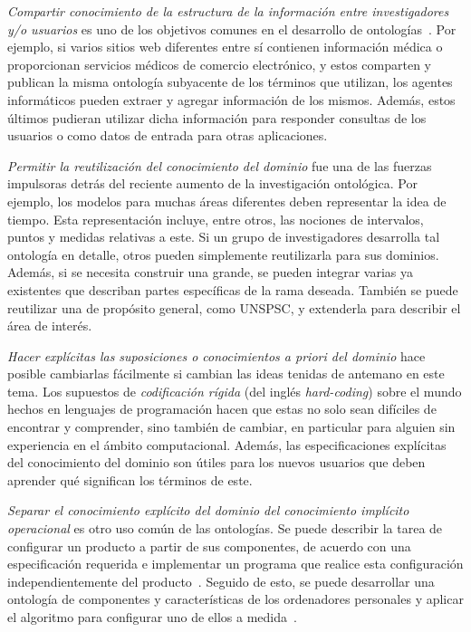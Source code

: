 \textit{Compartir conocimiento de la estructura de la información entre investigadores y/o usuarios} es uno de los objetivos comunes en el desarrollo de ontologías~\cite{ref:4,ref:10}. Por ejemplo, si varios sitios web diferentes entre sí contienen información médica o proporcionan servicios médicos de comercio electrónico, y estos comparten y publican la misma ontología subyacente de los términos que utilizan, los agentes informáticos pueden extraer y agregar información de los mismos. Además, estos últimos pudieran utilizar dicha información para responder consultas de los usuarios o como datos de entrada para otras aplicaciones.

\textit{Permitir la reutilización del conocimiento del dominio} fue una de las fuerzas impulsoras detrás del reciente aumento de la investigación ontológica. Por ejemplo, los modelos para muchas áreas diferentes deben representar la idea de tiempo. Esta representación incluye, entre otros, las nociones de intervalos, puntos y medidas relativas a este. Si un grupo de investigadores desarrolla tal ontología en detalle, otros pueden simplemente reutilizarla para sus dominios. Además, si se necesita construir una grande, se pueden integrar varias ya existentes que describan partes específicas de la rama deseada. También se puede reutilizar una de propósito general, como UNSPSC, y extenderla para describir el área de interés.

\textit{Hacer explícitas las suposiciones o conocimientos a priori del dominio} hace posible cambiarlas fácilmente si cambian las ideas tenidas de antemano en este tema. Los supuestos de \textit{codificación rígida} (del inglés \textit{hard-coding}) sobre el mundo hechos en lenguajes de programación hacen que estas no solo sean difíciles de encontrar y comprender, sino también de cambiar, en particular para alguien sin experiencia en el ámbito computacional. Además, las especificaciones explícitas del conocimiento del dominio son útiles para los nuevos usuarios que deben aprender qué significan los términos de este.

\textit{Separar el conocimiento explícito del dominio del conocimiento implícito operacional} es otro uso común de las ontologías. Se puede describir la tarea de configurar un producto a partir de sus componentes, de acuerdo con una especificación requerida e implementar un programa que realice esta configuración independientemente del producto~\cite{ref:11}. Seguido de esto, se puede desarrollar una ontología de componentes y características de los ordenadores personales y aplicar el algoritmo para configurar uno de ellos a medida~\cite{ref:12}.

